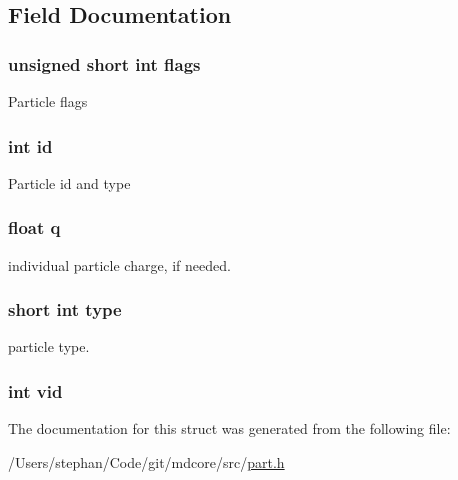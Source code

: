\subsection{Field Documentation}
\hypertarget{structpart_ae718cba7f740adbac78a900ce25b73af}{
\subsubsection[{flags}]{\setlength{\rightskip}{0pt plus 5cm}unsigned short int flags}}\label{structpart_ae718cba7f740adbac78a900ce25b73af}
Particle flags \hypertarget{structpart_a7441ef0865bcb3db9b8064dd7375c1ea}{
\subsubsection[{id}]{\setlength{\rightskip}{0pt plus 5cm}int id}}\label{structpart_a7441ef0865bcb3db9b8064dd7375c1ea}
Particle id and type \hypertarget{structpart_a0a19a0620af7373e3ddba0ce4e1058e1}{
\subsubsection[{q}]{\setlength{\rightskip}{0pt plus 5cm}float q}}\label{structpart_a0a19a0620af7373e3ddba0ce4e1058e1}
individual particle charge, if needed. \hypertarget{structpart_aaa8ba4297d83f2cce5af75b18564ae13}{
\subsubsection[{type}]{\setlength{\rightskip}{0pt plus 5cm}short int type}}\label{structpart_aaa8ba4297d83f2cce5af75b18564ae13}
particle type. \hypertarget{structpart_af1cae64e47ec410dab67cb572e4acd36}{
\subsubsection[{vid}]{\setlength{\rightskip}{0pt plus 5cm}int vid}}\label{structpart_af1cae64e47ec410dab67cb572e4acd36}


The documentation for this struct was generated from the following file\-:\begin{DoxyCompactItemize}
\item 
/\-Users/stephan/\-Code/git/mdcore/src/\hyperlink{part_8h}{part.\-h}\end{DoxyCompactItemize}
